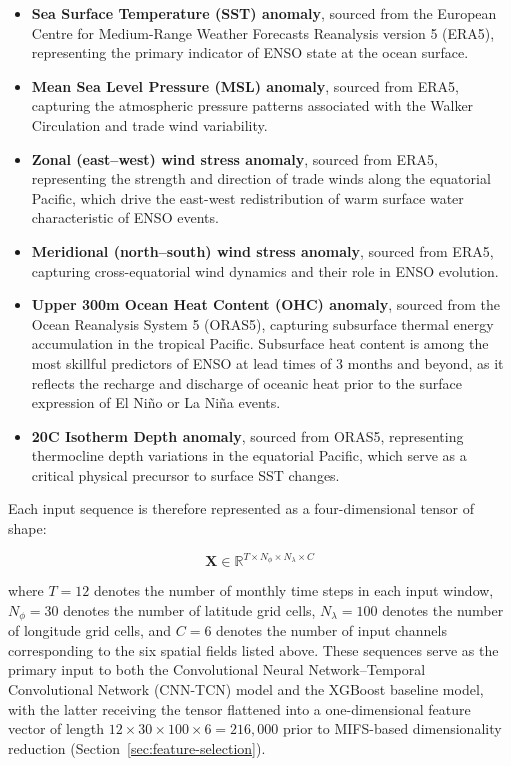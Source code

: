 \begin{itemize}
    \item \textbf{Sea Surface Temperature (SST) anomaly}, sourced from the European Centre for Medium-Range Weather Forecasts Reanalysis version 5 (ERA5), representing the primary indicator of ENSO state at the ocean surface.
    \item \textbf{Mean Sea Level Pressure (MSL) anomaly}, sourced from ERA5, capturing the atmospheric pressure patterns associated with the Walker Circulation and trade wind variability.
    \item \textbf{Zonal (east--west) wind stress anomaly}, sourced from ERA5, representing the strength and direction of trade winds along the equatorial Pacific, which drive the east-west redistribution of warm surface water characteristic of ENSO events.
    \item \textbf{Meridional (north--south) wind stress anomaly}, sourced from ERA5, capturing cross-equatorial wind dynamics and their role in ENSO evolution.
    \item \textbf{Upper 300m Ocean Heat Content (OHC) anomaly}, sourced from the Ocean Reanalysis System 5 (ORAS5), capturing subsurface thermal energy accumulation in the tropical Pacific. Subsurface heat content is among the most skillful predictors of ENSO at lead times of 3 months and beyond, as it reflects the recharge and discharge of oceanic heat prior to the surface expression of El Ni\~{n}o or La Ni\~{n}a events.
    \item \textbf{20\degree C Isotherm Depth anomaly}, sourced from ORAS5, representing thermocline depth variations in the equatorial Pacific, which serve as a critical physical precursor to surface SST changes.
\end{itemize}

Each input sequence is therefore represented as a four-dimensional tensor of shape:

\begin{equation}
\mathbf{X} \in \mathbb{R}^{T \times N_{\phi} \times N_{\lambda} \times C}
\end{equation}

\noindent where $T = 12$ denotes the number of monthly time steps in each input window, $N_{\phi} = 30$ denotes the number of latitude grid cells, $N_{\lambda} = 100$ denotes the number of longitude grid cells, and $C = 6$ denotes the number of input channels corresponding to the six spatial fields listed above. These sequences serve as the primary input to both the Convolutional Neural Network--Temporal Convolutional Network (CNN-TCN) model and the XGBoost baseline model, with the latter receiving the tensor flattened into a one-dimensional feature vector of length $12 \times 30 \times 100 \times 6 = 216{,}000$ prior to MIFS-based dimensionality reduction (Section~\ref{sec:feature-selection}).



